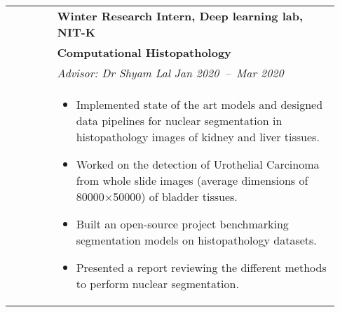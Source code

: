 \documentclass[letterpaper, 10pt, oneside]{article}
\newcommand{\bdit}[1]{{\textbf{#1}}}
\begin{document}
\begin{longtable}{@{} p{0.13\linewidth} p{0.8\linewidth}}
                         & \bdit{Winter Research Intern, Deep learning lab, NIT-K}                                                                                                                                                           \\
                         & \bdit{Computational Histopathology}                                                                                                                                                                               \\
                         & \textsl{Advisor: Dr Shyam Lal} \hfill \hspace{-3em} \textsl{Jan 2020\ --\ Mar 2020}                                                                                                                               \\
                         & \parbox{0.8\textwidth}{                                                                                                                                                                                           %
        \begin{itemize}[leftmargin=*, itemsep=-0.88ex, topsep=-0.88ex]
            \item Implemented state of the art models and designed data pipelines for nuclear segmentation in histopathology images of kidney and liver tissues.
            \item Worked on the detection of Urothelial Carcinoma from whole slide images (average dimensions of 80000$\times$50000) of bladder tissues.
            \item Built an open-source project benchmarking segmentation models on histopathology datasets.
            \item Presented a report reviewing the different methods to perform nuclear segmentation.
        \end{itemize}
    }
    \\
    \\


\end{longtable}
\end{document}
